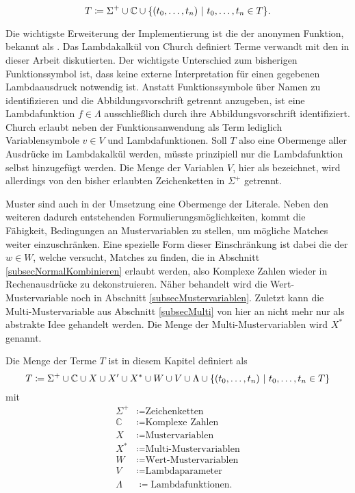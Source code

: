 $$T \coloneqq \Sigma^+ \cup \mathbb C \cup \curl*{(\elems t 0 n)~|~ \elems t 0 n \in T}.$$

Die wichtigste Erweiterung der Implementierung ist die der anonymen Funktion, bekannt als . Das Lambdakalkül von Church \cite{ChurchLambda36} definiert Terme verwandt mit den in dieser Arbeit diskutierten. Der wichtigste Unterschied zum bisherigen Funktionssymbol ist, dass keine externe Interpretation für einen gegebenen Lambdaausdruck notwendig ist. Anstatt Funktionssymbole über Namen zu identifizieren und die Abbildungsvorschrift getrennt anzugeben, ist eine Lambdafunktion $f \in \Lambda$ ausschließlich durch ihre Abbildungsvorschrift identifiziert. Church erlaubt neben der Funktionsanwendung als Term lediglich Variablensymbole  $v \in V$ und Lambdafunktionen. Soll $T$ also eine Obermenge aller Ausdrücke im Lambdakalkül werden, müsste prinzipiell nur die Lambdafunktion selbst hinzugefügt werden. Die Menge der Variablen $V$, hier als  bezeichnet, wird allerdings von den bisher erlaubten Zeichenketten in $\Sigma^+$ getrennt.

Muster sind auch in der Umsetzung eine Obermenge der Literale. 
Neben den weiteren dadurch entstehenden Formulierungsmöglichkeiten, kommt die Fähigkeit, Bedingungen an Mustervariablen zu stellen, um mögliche Matches weiter einzuschränken. 
Eine spezielle Form dieser Einschränkung ist dabei die der  $w \in W$, welche versucht, Matches zu finden, die in Abschnitt \ref{subsecNormalKombinieren} erlaubt werden, also Komplexe Zahlen wieder in Rechenausdrücke zu dekonstruieren. Näher behandelt wird die Wert-Mustervariable noch in Abschnitt \ref{subsecMustervariablen}. 
Zuletzt kann die Multi-Mustervariable aus Abschnitt \ref{subsecMulti} von hier an nicht mehr nur als abstrakte Idee gehandelt werden. Die Menge der Multi-Mustervariablen wird $X^*$ genannt. 

\begin{definition} \label{defKnotentypenMathe}
Die Menge der Terme $T$ ist in diesem Kapitel definiert als
$$T \coloneqq \Sigma^+ \cup \mathbb C \cup X \cup X' \cup X^* \cup W \cup V \cup \Lambda \cup \curl*{(\elems t 0 n)~|~ \elems t 0 n \in T}$$
mit
\begin{align*}
    \Sigma^+  &\coloneqq \text{Zeichenketten}\\
    \mathbb C &\coloneqq \text{Komplexe Zahlen}\\
    X         &\coloneqq \text{Mustervariablen}\\
    X^*       &\coloneqq \text{Multi-Mustervariablen}\\
    W         &\coloneqq \text{Wert-Mustervariablen}\\
    V         &\coloneqq \text{Lambdaparameter}\\
    \Lambda   &\coloneqq \text{Lambdafunktionen}.
\end{align*}
\end{definition}






